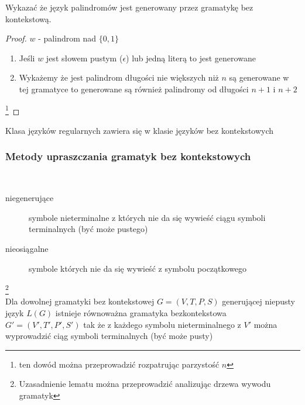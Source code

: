 	
	\begin{przyklad}
		Wykazać że język palindromów jest generowany przez gramatykę bez kontekstową.
	\begin{proof}
		$w$ - palindrom nad $\{0,1\}$ \\
		\begin{enumerate}
			\item Jeśli $w$ jest słowem pustym ($\epsilon$) lub jedną literą to jest generowane
			\item Wykażemy że jest palindrom długości nie większych niż $n$ są generowane w tej gramatyce to
			generowane są również palindromy od długości $n+1$ i $n+2$\\
		\end{enumerate}\footnote{ten dowód można przeprowadzić rozpatrując parzystość $n$}
	\end{proof}
	\end{przyklad}		
	
	\begin{tw}
	Klasa języków regularnych zawiera się w klasie języków bez kontekstowych
	\end{tw}
	
	\subsubsection{Metody upraszczania gramatyk bez kontekstowych}
	
	\begin{df}~\\
		\begin{description}
			\item[niegenerujące] symbole nieterminalne z których nie da się wywieść ciągu symboli terminalnych (być może pustego)
			\item[nieosiągalne] symbole których nie da się wywieść z symbolu początkowego
		\end{description}				
	\end{df}	
	
	\begin{lemat}\footnote{Uzasadnienie lematu można przeprowadzić analizując drzewa wywodu gramatyk}~\\
		Dla dowolnej gramatyki bez kontekstowej $G = (V, T, P, S)$ generującej niepusty język $L(G)$ istnieje równoważna gramatyka
		bezkontekstowa $G' = (V', T', P', S')$ tak że z każdego symbolu nieterminalnego z $V'$ można wyprowadzić ciąg symboli terminalnych (być może pusty)
	\end{lemat}	
	
